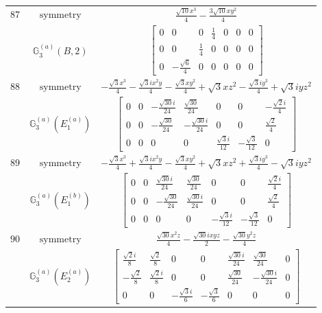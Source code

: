 \documentclass[fleqn,8pt,landscape]{jsarticle}
\begin{document}
\begin{longtable}{ccc}
$ 87 $ & $ \text{symmetry} $ & $ \frac{\sqrt{10} x^{3}}{4} - \frac{3 \sqrt{10} x y^{2}}{4} $ \\
$  $ & $ \mathbb{G}_{3}^{(a)}(B,2) $ & $ \begin{bmatrix} 0 & 0 & 0 & \frac{1}{4} & 0 & 0 & 0 \\ 0 & 0 & \frac{1}{4} & 0 & 0 & 0 & 0 \\ 0 & - \frac{\sqrt{6}}{4} & 0 & 0 & 0 & 0 & 0 \end{bmatrix} $ \\ \hline
$ 88 $ & $ \text{symmetry} $ & $ - \frac{\sqrt{3} x^{3}}{4} - \frac{\sqrt{3} i x^{2} y}{4} - \frac{\sqrt{3} x y^{2}}{4} + \sqrt{3} x z^{2} - \frac{\sqrt{3} i y^{3}}{4} + \sqrt{3} i y z^{2} $ \\
$  $ & $ \mathbb{G}_{3}^{(a)}(E_{1}^{(a)}) $ & $ \begin{bmatrix} 0 & 0 & - \frac{\sqrt{30} i}{24} & \frac{\sqrt{30}}{24} & 0 & 0 & - \frac{\sqrt{2} i}{4} \\ 0 & 0 & - \frac{\sqrt{30}}{24} & - \frac{\sqrt{30} i}{24} & 0 & 0 & \frac{\sqrt{2}}{4} \\ 0 & 0 & 0 & 0 & \frac{\sqrt{3} i}{12} & - \frac{\sqrt{3}}{12} & 0 \end{bmatrix} $ \\ \hline
$ 89 $ & $ \text{symmetry} $ & $ - \frac{\sqrt{3} x^{3}}{4} + \frac{\sqrt{3} i x^{2} y}{4} - \frac{\sqrt{3} x y^{2}}{4} + \sqrt{3} x z^{2} + \frac{\sqrt{3} i y^{3}}{4} - \sqrt{3} i y z^{2} $ \\
$  $ & $ \mathbb{G}_{3}^{(a)}(E_{1}^{(b)}) $ & $ \begin{bmatrix} 0 & 0 & \frac{\sqrt{30} i}{24} & \frac{\sqrt{30}}{24} & 0 & 0 & \frac{\sqrt{2} i}{4} \\ 0 & 0 & - \frac{\sqrt{30}}{24} & \frac{\sqrt{30} i}{24} & 0 & 0 & \frac{\sqrt{2}}{4} \\ 0 & 0 & 0 & 0 & - \frac{\sqrt{3} i}{12} & - \frac{\sqrt{3}}{12} & 0 \end{bmatrix} $ \\ \hline
$ 90 $ & $ \text{symmetry} $ & $ \frac{\sqrt{30} x^{2} z}{4} - \frac{\sqrt{30} i x y z}{2} - \frac{\sqrt{30} y^{2} z}{4} $ \\
$  $ & $ \mathbb{G}_{3}^{(a)}(E_{2}^{(a)}) $ & $ \begin{bmatrix} \frac{\sqrt{2} i}{8} & \frac{\sqrt{2}}{8} & 0 & 0 & \frac{\sqrt{30} i}{24} & \frac{\sqrt{30}}{24} & 0 \\ - \frac{\sqrt{2}}{8} & \frac{\sqrt{2} i}{8} & 0 & 0 & \frac{\sqrt{30}}{24} & - \frac{\sqrt{30} i}{24} & 0 \\ 0 & 0 & - \frac{\sqrt{3} i}{6} & - \frac{\sqrt{3}}{6} & 0 & 0 & 0 \end{bmatrix} $ \\ \hline

\end{longtable}
\end{document}

